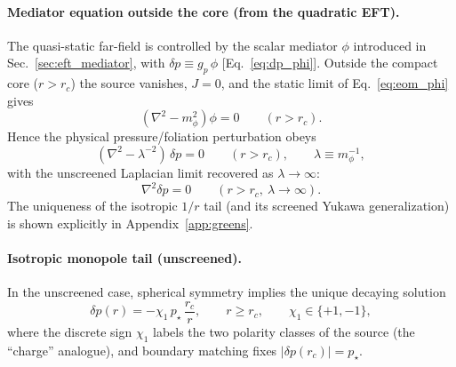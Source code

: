 \documentclass[pdflatex,sn-mathphys-num]{revtex4-2}
\providecommand{\rc}{r_c}
\begin{document}
    \paragraph{Mediator equation outside the core (from the quadratic EFT).}
        The quasi-static far-field is controlled by the scalar mediator \(\phi\) introduced in
        Sec.~\ref{sec:eft_mediator}, with \(\delta p \equiv g_p\,\phi\) [Eq.~\eqref{eq:dp_phi}].
        Outside the compact core (\(r>\rc\)) the source vanishes, \(J=0\), and the static limit of
        Eq.~\eqref{eq:eom_phi} gives
        \begin{equation}
            (\nabla^2 - m_\phi^2)\phi = 0 \qquad (r>\rc).
        \end{equation}
        Hence the physical pressure/foliation perturbation obeys
        \begin{equation}
            (\nabla^2 - \lambda^{-2})\,\delta p = 0 \qquad (r>\rc),
            \qquad \lambda \equiv m_\phi^{-1},
            \label{eq:dp_helmholtz_outside}
        \end{equation}
        with the unscreened Laplacian limit recovered as \(\lambda\to\infty\):
        \begin{equation}
            \nabla^2 \delta p = 0 \qquad (r>\rc,\ \lambda\to\infty).
            \label{eq:laplace_dp}
        \end{equation}
        The uniqueness of the isotropic \(1/r\) tail (and its screened Yukawa generalization) is shown explicitly in
        Appendix~\ref{app:greens}.

    \paragraph{Isotropic monopole tail (unscreened).}
        In the unscreened case, spherical symmetry implies the unique decaying solution
        \begin{equation}
            \delta p(r) = -\chi_1\,p_\star\,\frac{\rc}{r}, \qquad r\ge \rc,\qquad \chi_1\in\{+1,-1\},
            \label{eq:dp_monopole}
        \end{equation}
        where the discrete sign \(\chi_1\) labels the two polarity classes of the source (the ``charge'' analogue),
        and boundary matching fixes \(|\delta p(\rc)|=p_\star\).
\end{document}
